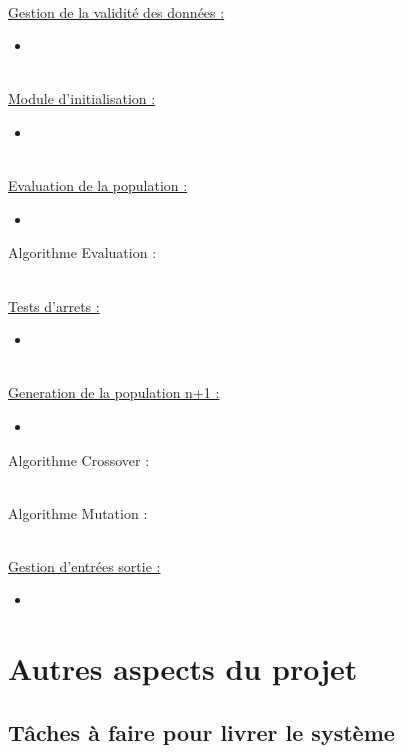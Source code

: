 \documentclass[a4paper,11pt]{article}
\begin{document}
		\hspace{1cm}\\
		\underline{Gestion de la validité des données : }
		\begin{itemize}
			\item
		\end{itemize}
		
		\hspace{1cm}\\
		\underline{Module d'initialisation : }
		\begin{itemize}
			\item
		\end{itemize}
	
		\hspace{1cm}\\
		\underline{Evaluation de la population : }
		\begin{itemize}
			\item
		\end{itemize}
		Algorithme Evaluation :
		
		\hspace{1cm}\\
		\underline{Tests d'arrets : }
		\begin{itemize}
			\item
		\end{itemize}

		\hspace{1cm}\\
		\underline{Generation de la population n+1 : }
		\begin{itemize}
			\item
		\end{itemize}
		Algorithme Crossover :
		
		\hspace{1cm}\\
		Algorithme Mutation :
		
		\hspace{1cm}\\
		\underline{Gestion d'entrées sortie : }
		\begin{itemize}
			\item
		\end{itemize}
		
	\section{Autres aspects du projet}
		\subsection{Tâches à faire pour livrer le système}
		
\end{document}
